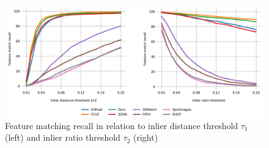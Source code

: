 \begin{figure}[t!]
    \centering
    \includegraphics[width=\columnwidth]{figures/images/fmr.png}

    \caption{Feature matching recall in relation to inlier distance threshold $\tau_{1}$ (left) and inlier ratio threshold $\tau_{2}$ (right)}
    \label{fig:fmr}
\end{figure}